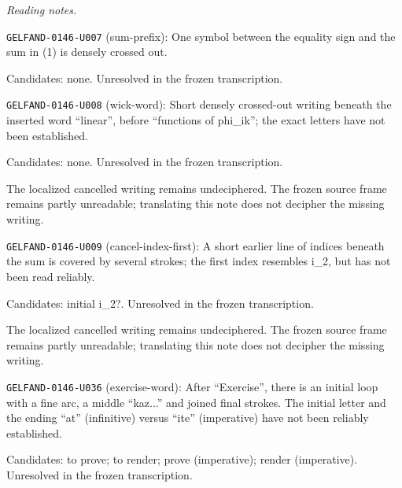 \par\smallskip\noindent\textit{Reading notes.}\par
\noindent\texttt{GELFAND-0146-U007} (sum-prefix): One symbol between the equality sign and the sum in (1) is densely crossed out.\par
Candidates: none. Unresolved in the frozen transcription.\par
\noindent\texttt{GELFAND-0146-U008} (wick-word): Short densely crossed-out writing beneath the inserted word “linear”, before “functions of phi\_ik”; the exact letters have not been established.\par
Candidates: none. Unresolved in the frozen transcription.\par
The localized cancelled writing remains undeciphered. The frozen source frame remains partly unreadable; translating this note does not decipher the missing writing.\par
\noindent\texttt{GELFAND-0146-U009} (cancel-index-first): A short earlier line of indices beneath the sum is covered by several strokes; the first index resembles i\_2, but has not been read reliably.\par
Candidates: initial i\_2?. Unresolved in the frozen transcription.\par
The localized cancelled writing remains undeciphered. The frozen source frame remains partly unreadable; translating this note does not decipher the missing writing.\par
\noindent\texttt{GELFAND-0146-U036} (exercise-word): After “Exercise”, there is an initial loop with a fine arc, a middle “kaz...” and joined final strokes. The initial letter and the ending “at” (infinitive) versus “ite” (imperative) have not been reliably established.\par
Candidates: to prove; to render; prove (imperative); render (imperative). Unresolved in the frozen transcription.\par


